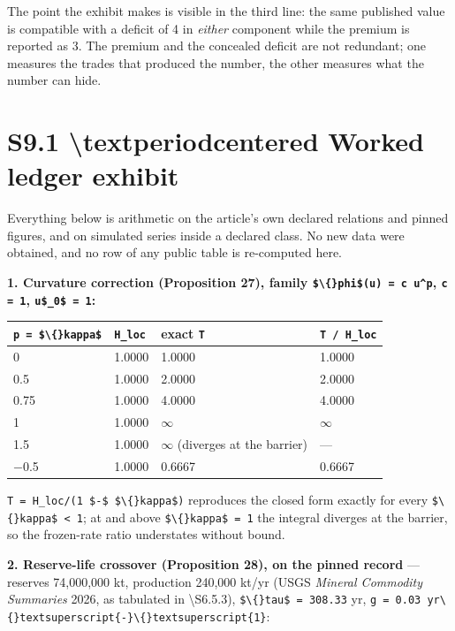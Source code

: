 \documentclass[11pt]{article}
\begin{document}
The point the exhibit makes is visible in the third line: the same published value is compatible with a deficit of 4 in \emph{either} component while the premium is reported as 3. The premium and the concealed deficit are not redundant; one measures the trades that produced the number, the other measures what the number can hide.

\vspace{0.8em}

\section*{S9.1 \textbackslash{}textperiodcentered{} Worked ledger exhibit}\label{s91-textperiodcentered{}-worked-ledger-exhibit}

Everything below is arithmetic on the article's own declared relations and pinned figures, and on simulated series inside a declared class. No new data were obtained, and no row of any public table is re-computed here.

\textbf{1. Curvature correction (Proposition 27), family \texttt{\$\textbackslash\{\}phi\$(u) = c u\textasciicircum{}p}, \texttt{c = 1}, \texttt{u\$\_0\$ = 1}:}

\begin{longtable}{@{}l|l|l|l@{}}
\toprule
\texttt{p = \$\textbackslash\{\}kappa\$} & \texttt{H\_loc} & exact \texttt{T} & \texttt{T / H\_loc} \\
\midrule
0 & 1.0000 & 1.0000 & 1.0000 \\
0.5 & 1.0000 & 2.0000 & 2.0000 \\
0.75 & 1.0000 & 4.0000 & 4.0000 \\
1 & 1.0000 & \(\infty\) & \(\infty\) \\
1.5 & 1.0000 & \(\infty\) (diverges at the barrier) & --- \\
\(-\)0.5 & 1.0000 & 0.6667 & 0.6667 \\
\bottomrule
\end{longtable}

\texttt{T = H\_loc/(1 \$-\$ \$\textbackslash\{\}kappa\$)} reproduces the closed form exactly for every \texttt{\$\textbackslash\{\}kappa\$ < 1}; at and above \texttt{\$\textbackslash\{\}kappa\$ = 1} the integral diverges at the barrier, so the frozen-rate ratio understates without bound.

\textbf{2. Reserve-life crossover (Proposition 28), on the pinned record} --- reserves 74,000,000 kt, production 240,000 kt/yr (USGS \emph{Mineral Commodity Summaries} 2026, as tabulated in \textbackslash{}S{}6.5.3), \texttt{\$\textbackslash\{\}tau\$ = 308.33} yr, \texttt{g = 0.03 yr\textbackslash\{\}textsuperscript\{-\}\textbackslash\{\}textsuperscript\{1\}}:
\end{document}
